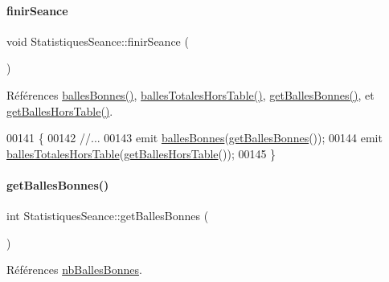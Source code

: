 \paragraph{\texorpdfstring{finir\+Seance}{finirSeance}}
{\footnotesize\ttfamily void Statistiques\+Seance\+::finir\+Seance (\begin{DoxyParamCaption}{ }\end{DoxyParamCaption})\hspace{0.3cm}{\ttfamily [slot]}}



Références \hyperlink{class_statistiques_seance_aa3ee6b00dae44d1f3cf78349ba235b08}{balles\+Bonnes()}, \hyperlink{class_statistiques_seance_a02a327f2a69eed4208b7b2076c6a67f2}{balles\+Totales\+Hors\+Table()}, \hyperlink{class_statistiques_seance_a0dad2ceb22672adf343548b35bf86ba1}{get\+Balles\+Bonnes()}, et \hyperlink{class_statistiques_seance_a26b717d40065e7afd80465458f3cb6aa}{get\+Balles\+Hors\+Table()}.


\begin{DoxyCode}
00141 \{
00142     \textcolor{comment}{//...}
00143     emit \hyperlink{class_statistiques_seance_aa3ee6b00dae44d1f3cf78349ba235b08}{ballesBonnes}(\hyperlink{class_statistiques_seance_a0dad2ceb22672adf343548b35bf86ba1}{getBallesBonnes}());
00144     emit \hyperlink{class_statistiques_seance_a02a327f2a69eed4208b7b2076c6a67f2}{ballesTotalesHorsTable}(\hyperlink{class_statistiques_seance_a26b717d40065e7afd80465458f3cb6aa}{getBallesHorsTable}());
00145 \}
\end{DoxyCode}
\mbox{\label{class_statistiques_seance_a0dad2ceb22672adf343548b35bf86ba1}} 
\paragraph{\texorpdfstring{get\+Balles\+Bonnes()}{getBallesBonnes()}}
{\footnotesize\ttfamily int Statistiques\+Seance\+::get\+Balles\+Bonnes (\begin{DoxyParamCaption}{ }\end{DoxyParamCaption})}



Références \hyperlink{class_statistiques_seance_af62043be598fd6b7cd7ddbc37eadf967}{nb\+Balles\+Bonnes}.




